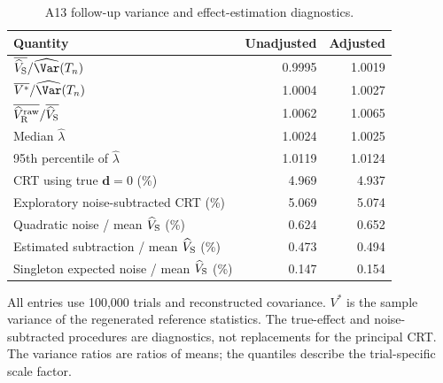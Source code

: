 \begin{table}[!htbp]
\centering
\caption{A13 follow-up variance and effect-estimation diagnostics.}
\label{tab:supp-focused-A13}
\begin{threeparttable}
\begin{singlespace}
\small
\setlength{\tabcolsep}{3.5pt}
\renewcommand{\arraystretch}{1.1}
\begin{tabular}{@{}lrr@{}}
\toprule
Quantity & Unadjusted & Adjusted\\
\midrule
$\overline{\widehat V_{\rm S}}/\widehat{\Var}(T_n)$ & 0.9995 & 1.0019 \\
$\overline{V^*}/\widehat{\Var}(T_n)$ & 1.0004 & 1.0027 \\
$\overline{\widehat V_{\rm R}^{\rm raw}}/\overline{\widehat V_{\rm S}}$ & 1.0062 & 1.0065 \\
Median $\widehat\lambda$ & 1.0024 & 1.0025 \\
95th percentile of $\widehat\lambda$ & 1.0119 & 1.0124 \\
CRT using true $\bm d=0$ (\%) & 4.969 & 4.937 \\
Exploratory noise-subtracted CRT (\%) & 5.069 & 5.074 \\
Quadratic noise / mean $\widehat V_{\rm S}$ (\%) & 0.624 & 0.652 \\
Estimated subtraction / mean $\widehat V_{\rm S}$ (\%) & 0.473 & 0.494 \\
Singleton expected noise / mean $\widehat V_{\rm S}$ (\%) & 0.147 & 0.154 \\
\bottomrule
\end{tabular}
\begin{tablenotes}[flushleft]\footnotesize
\item[] All entries use 100,000 trials and reconstructed covariance. $V^*$ is the sample variance of the regenerated reference statistics. The true-effect and noise-subtracted procedures are diagnostics, not replacements for the principal CRT. The variance ratios are ratios of means; the quantiles describe the trial-specific scale factor.
\end{tablenotes}
\end{singlespace}
\end{threeparttable}
\end{table}
